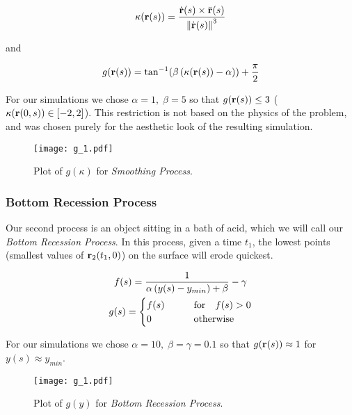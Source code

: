 \[
  \kappa(\bvec{r}(s)) = \frac{\dot{\bvec{r}}(s) \times \ddot{\bvec{r}}(s)}{\norm{\dot{\bvec{r}}(s)}^3}
\]

and

\begin{equation}
  g(\mathbf{r}(s)) = \tan^{-1}(\beta \, (\kappa(\mathbf{r}(s)) - \alpha)) + \frac{\pi}{2}
\end{equation}

For our simulations we chose $\alpha = 1, \; \beta = 5$ so that $g(\mathbf{r}(s)) \le 3$ ($\kappa(\mathbf{r}(0, s)) \in [-2, 2]$). This restriction is not based on the physics of the problem, and was chosen purely for the aesthetic look of the resulting simulation.

\begin{figure}[h!]
    \begin{center}
      \texttt{[image: g\_1.pdf]}
    \end{center}
  \vspace{-.2in} %
  \caption{\label{fig:g-1} Plot of $g(\kappa)$ for \textit{Smoothing Process}.}
\end{figure}

\subsubsection*{Bottom Recession Process}

Our second process is an object sitting in a bath of acid, which we will call our \textit{Bottom Recession Process}. In this process, given a time $t_1$, the lowest points (smallest values of $\mathbf{r}_2(t_1, 0)$) on the surface will erode quickest.

\begin{gather}
  f(s) = \frac{1}{\alpha \, (y(s) - y_{min}) + \beta} - \gamma \notag\\
  g(s) = \begin{cases}
    f(s) \qquad &\text{for} \quad f(s) > 0\\
    0 \qquad &\text{otherwise}
  \end{cases}
\end{gather}

For our simulations we chose $\alpha = 10, \; \beta = \gamma = 0.1$ so that $g(\mathbf{r}(s)) \approx 1$ for $y(s) \approx y_{min}$.

\begin{figure}[h!]
    \begin{center}
      \texttt{[image: g\_1.pdf]}
    \end{center}
  \vspace{-.2in} %
  \caption{\label{fig:g-2} Plot of $g(y)$ for \textit{Bottom Recession Process}.}
\end{figure}


